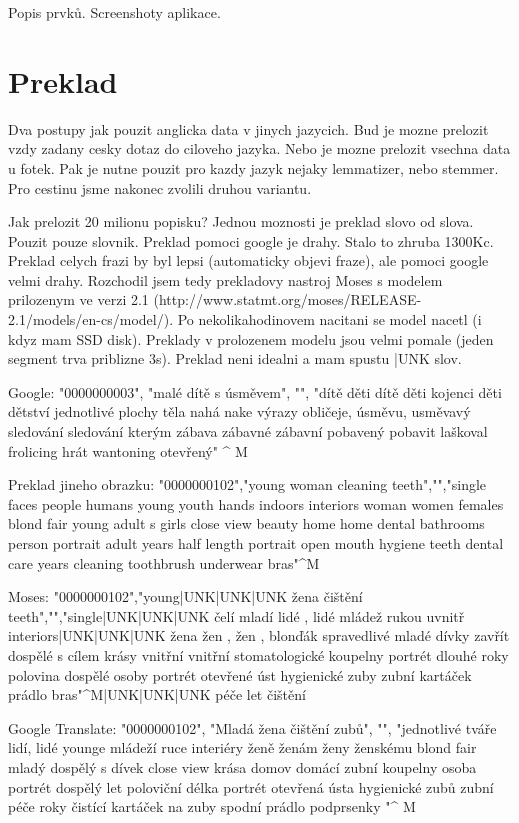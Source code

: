 Popis prvků. Screenshoty aplikace.

\section{Preklad}

Dva postupy jak pouzit anglicka data v jinych jazycich. Bud je mozne prelozit vzdy zadany cesky dotaz do ciloveho jazyka. Nebo je mozne prelozit vsechna data u fotek. Pak je nutne pouzit pro kazdy jazyk nejaky lemmatizer, nebo stemmer. Pro cestinu jsme nakonec zvolili druhou variantu.

Jak prelozit 20 milionu popisku? Jednou moznosti je preklad slovo od slova. Pouzit pouze slovnik. Preklad pomoci google je drahy. Stalo to zhruba 1300Kc. Preklad celych frazi by byl lepsi (automaticky objevi fraze), ale pomoci google velmi drahy. Rozchodil jsem tedy prekladovy nastroj Moses s modelem prilozenym ve verzi 2.1 (http://www.statmt.org/moses/RELEASE-2.1/models/en-cs/model/). Po nekolikahodinovem nacitani se model nacetl (i kdyz mam SSD disk). Preklady v prolozenem modelu jsou velmi pomale (jeden segment trva priblizne 3s). Preklad neni idealni a mam spustu |UNK slov.

Google:
"0000000003", "malé dítě s úsměvem", "", "dítě děti dítě děti kojenci děti dětství jednotlivé plochy těla nahá nake výrazy obličeje, úsměvu, usměvavý sledování sledování kterým zábava zábavné zábavní pobavený pobavit laškoval frolicing hrát wantoning otevřený" ^ M

Preklad jineho obrazku:
"0000000102","young woman cleaning teeth","","single faces people humans young youth hands indoors interiors woman women females blond fair young adult s girls close view beauty home home dental bathrooms person portrait adult years half length portrait open mouth hygiene teeth dental care years cleaning toothbrush underwear bras"^M

Moses:
"0000000102","young|UNK|UNK|UNK žena čištění teeth","","single|UNK|UNK|UNK čelí mladí lidé , lidé mládež rukou uvnitř interiors|UNK|UNK|UNK žena žen , žen , blonďák spravedlivé mladé dívky zavřít dospělé s cílem krásy vnitřní vnitřní stomatologické koupelny portrét dlouhé roky polovina dospělé osoby portrét otevřené úst hygienické zuby zubní kartáček prádlo bras"^M|UNK|UNK|UNK péče let čištění

Google Translate:
"0000000102", "Mladá žena čištění zubů", "", "jednotlivé tváře lidí, lidé younge mládeží ruce interiéry ženě ženám ženy ženskému blond fair mladý dospělý s dívek close view krása domov domácí zubní koupelny osoba portrét dospělý let poloviční délka portrét otevřená ústa hygienické zubů zubní péče roky čistící kartáček na zuby spodní prádlo podprsenky "^ M


